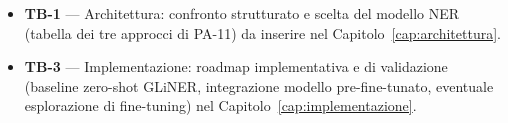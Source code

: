 \begin{itemize}
	\item \textbf{TB-1} — Architettura: confronto strutturato e scelta del modello NER (tabella dei tre approcci di PA-11) da inserire nel Capitolo~\ref{cap:architettura}.
	\item \textbf{TB-3} — Implementazione: roadmap implementativa e di validazione (baseline zero-shot GLiNER, integrazione modello pre-fine-tunato, eventuale esplorazione di fine-tuning) nel Capitolo~\ref{cap:implementazione}.
\end{itemize}
